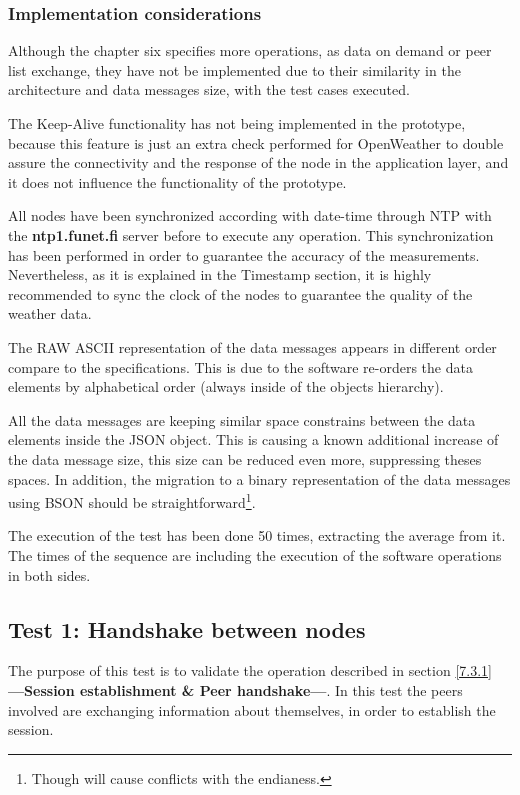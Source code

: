 \subsubsection{Implementation considerations}

Although the chapter six specifies more operations, as data on demand or peer list exchange, they have not be implemented due to their similarity in the architecture and data messages size, with the test cases executed.

The Keep-Alive functionality has not being implemented in the prototype, because this feature is just an extra check performed for OpenWeather to double assure the connectivity and the response of the node in the application layer, and it does not influence the functionality of the prototype.

All nodes have been synchronized according with date-time through \gls{NTP} \cite{rfc1305} with the \textbf{ntp1.funet.fi} server before to execute any operation. This synchronization has been performed in order to guarantee the accuracy of the measurements. Nevertheless, as it is explained in the Timestamp section, it is highly recommended to sync the clock of the nodes to guarantee the quality of the weather data.

The RAW \gls{ASCII} representation of the data messages appears in different order compare to the specifications. This is due to the software re-orders the data elements by alphabetical order (always inside of the objects hierarchy).

All the data messages are keeping similar space constrains between the data elements inside the \gls{JSON} object. This is causing a known additional increase of the data message size, this size can be reduced even more, suppressing theses spaces. In addition, the migration to a binary representation of the data messages using \gls{BSON}\cite{BSON} should be straightforward\footnote{Though will cause conflicts with the endianess.}.

The execution of the test has been done 50 times, extracting the average from it. The times of the sequence are including the execution of the software operations in both sides.

\subsection{Test 1: Handshake between nodes}

The purpose of this test is to validate the operation described in section \ref{7.3.1} \textbf{—Session establishment \& Peer handshake—}. In this test the peers involved are exchanging information about themselves, in order to establish the session.

